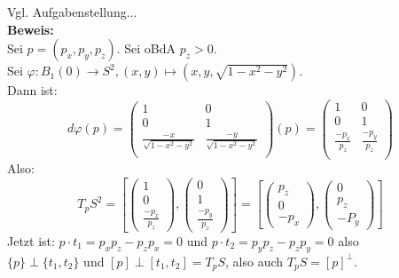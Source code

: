 \begin{problem*}[2b] Vgl. Aufgabenstellung... \\
\textbf{Beweis:} \\
Sei $p = (p_x, p_y, p_z)$. Sei oBdA $ p_z > 0 $.\\
Sei $\varphi : B_1(0) \to S^2, (x,y) \mapsto (x,y,\sqrt{ 1- x^2-y^2 })$. \\
Dann ist:
\begin{equation*} 
   d \varphi(p) = 
   \begin{pmatrix}
      1 & 0 \\
      0 & 1 \\
      \frac{-x}{\sqrt{ 1 - x^2 -y^2 }} & \frac{-y}{\sqrt{ 1 - x^2 -y^2 }} \\
    \end{pmatrix}(p) = 
    \begin{pmatrix}
        1 & 0 \\
      0 & 1 \\
     \frac{-p_x}{p_z} & \frac{-p_y}{p_z} \\
      
    \end{pmatrix} 
\end{equation*}
Also:
\begin{equation*}
  T_pS^2 = \left[
  \begin{pmatrix}
     1 \\
     0 \\
    \frac{-p_x}{p_z}
  \end{pmatrix},
  \begin{pmatrix}
     0 \\
     1 \\
    \frac{-p_y}{p_z}
  \end{pmatrix}
  \right] = \left[
    \begin{pmatrix}
     p_z\\
     0 \\
     -p_x
  \end{pmatrix},
  \begin{pmatrix}
     0 \\
     p_z \\
     -P_y
  \end{pmatrix}
  \right]
\end{equation*}
Jetzt ist: $p \cdot t_1 = p_xp_z - p_zp_x = 0$ und $ p \cdot t_2 = p_yp_z - p_zp_y = 0$ also \\
$\{ p \} \perp \{ t_1,t_2 \}$ und $[p] \perp [t_1,t_2] = T_pS$, also auch $T_pS = [p]^{ \perp }$.
\end{problem*}

